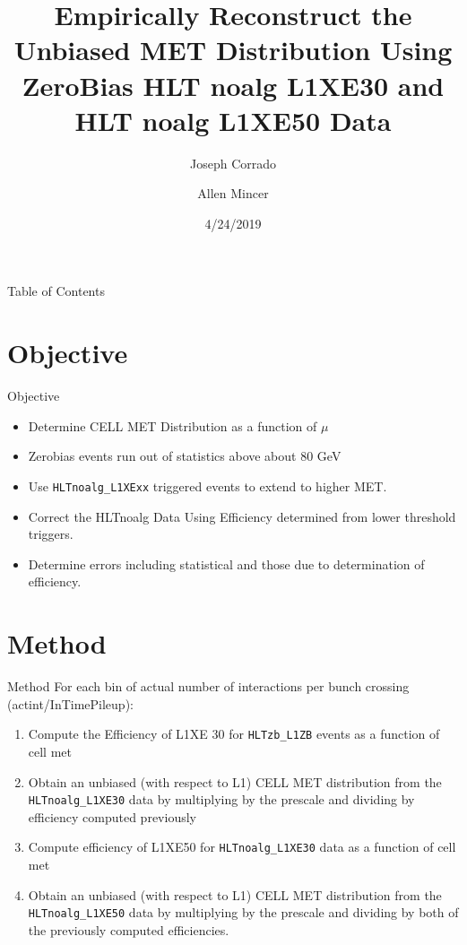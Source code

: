 \documentclass[]{beamer}
\title{Empirically Reconstruct the Unbiased MET Distribution Using ZeroBias HLT noalg L1XE30 and HLT noalg L1XE50 Data}
\author{Joseph Corrado \and Allen Mincer}                 %
\institute{New York University}      %
\date{4/24/2019}                    %
\begin{document}
\begin{frame}
  \titlepage
\end{frame}
\begin{frame}{Table of Contents}
        \tableofcontents
\end{frame}
\section{Objective}
\begin{frame}{Objective}
\begin{itemize}
        \item Determine CELL MET Distribution as a function of $\mu$
        \item Zerobias events run out of statistics above about 80 GeV
        \item Use \texttt{HLTnoalg\_L1XExx} triggered events to extend to higher MET.
        \item Correct the HLTnoalg Data Using Efficiency determined from lower threshold triggers.
        \item Determine errors including statistical and those due to determination of efficiency.
\end{itemize}
\end{frame}
\section{Method}
\begin{frame}{Method}
For each bin of actual number of interactions per bunch crossing (actint/InTimePileup):
\begin{enumerate}
        \item Compute the Efficiency of L1XE 30 for \texttt{HLTzb\_L1ZB} events as a function of cell met
        \item Obtain an unbiased (with respect to L1) CELL MET distribution from the \texttt{HLTnoalg\_L1XE30} data by multiplying by the prescale and dividing by efficiency computed previously
        \item Compute efficiency of L1XE50 for \texttt{HLTnoalg\_L1XE30} data as a function of cell met
        \item Obtain an unbiased (with respect to L1) CELL MET distribution from the \texttt{HLTnoalg\_L1XE50} data by multiplying by the prescale and dividing by both of the previously computed efficiencies.
\end{enumerate}
\end{frame}
\end{document}
